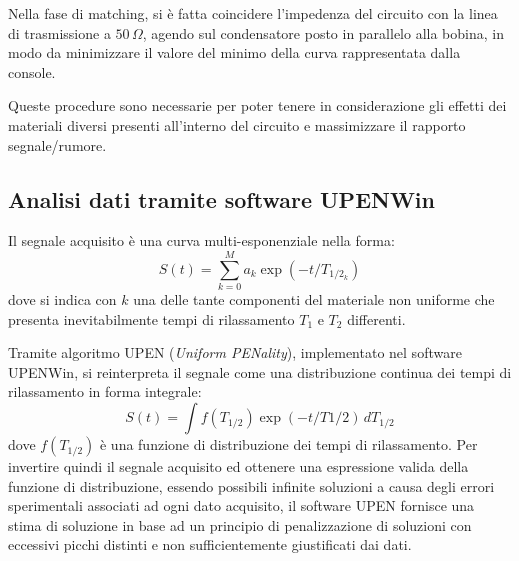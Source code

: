 Nella fase di matching, si è fatta coincidere l'impedenza del circuito con la linea di trasmissione a $50\si{\,}{\Omega}$, agendo sul condensatore posto in parallelo alla bobina, in modo da minimizzare il valore del minimo della curva rappresentata dalla console.

Queste procedure sono necessarie per poter tenere in considerazione gli effetti dei materiali diversi presenti all'interno del circuito e massimizzare il rapporto segnale/rumore.

\subsection*{Analisi dati tramite software UPENWin \cite{UpenWIN}}

Il segnale acquisito è una curva multi-esponenziale nella forma:
\begin{equation}
	S(t) = \sum_{k=0}^M a_k \exp(-t/T_{1/2_k})
\end{equation}
dove si indica con $k$ una delle tante componenti del materiale non uniforme che presenta inevitabilmente tempi di rilassamento $T_1$ e $T_2$ differenti.

Tramite algoritmo UPEN (\textit{Uniform PENality}), implementato nel software UPENWin, si reinterpreta il segnale come una distribuzione continua dei tempi di rilassamento in forma integrale:
\begin{equation}
	S(t) = \int f(T_{1/2}) \exp(-t/T{1/2}) \, dT_{1/2}
\end{equation}
dove $f(T_{1/2})$ è una funzione di distribuzione dei tempi di rilassamento. Per invertire quindi il segnale acquisito ed ottenere una espressione valida della funzione di distribuzione, essendo possibili infinite soluzioni a causa degli errori sperimentali associati ad ogni dato acquisito, il software UPEN fornisce una stima di soluzione in base ad un principio di penalizzazione di soluzioni con eccessivi picchi distinti e non sufficientemente giustificati dai dati.